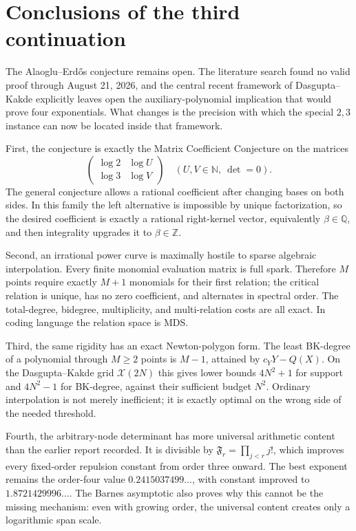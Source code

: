 \documentclass[11pt,oneside]{article}
\theoremstyle{definition}
\theoremstyle{remark}
\newcommand{\N}{\mathbb N}
\newcommand{\Z}{\mathbb Z}
\newcommand{\Q}{\mathbb Q}
\newcommand{\SF}[1]{\mathfrak F_{#1}}
\begin{document}
\section{Conclusions of the third continuation}
\label{sec:thirdconclusion}

The Alaoglu--Erd\H{o}s conjecture remains open.  The literature search found no valid proof
through August 21, 2026, and the central recent framework of Dasgupta--Kakde explicitly leaves
open the auxiliary-polynomial implication that would prove four exponentials.  What changes
is the precision with which the special $2,3$ instance can now be located inside that
framework.

First, the conjecture is exactly the Matrix Coefficient Conjecture on the matrices
\[
 \begin{pmatrix}\log2&\log U\\\log3&\log V\end{pmatrix}
 \quad(U,V\in\N,\ \det=0).
\]
The general conjecture allows a rational coefficient after changing bases on both sides.  In
this family the left alternative is impossible by unique factorization, so the desired
coefficient is exactly a rational right-kernel vector, equivalently $\beta\in\Q$, and then
integrality upgrades it to $\beta\in\Z$.

Second, an irrational power curve is maximally hostile to sparse algebraic interpolation.
Every finite monomial evaluation matrix is full spark.  Therefore $M$ points require exactly
$M+1$ monomials for their first relation; the critical relation is unique, has no zero
coefficient, and alternates in spectral order.  The total-degree, bidegree, multiplicity, and
multi-relation costs are all exact.  In coding language the relation space is MDS.

Third, the same rigidity has an exact Newton-polygon form.  The least BK-degree of a
polynomial through $M\ge2$ points is $M-1$, attained by $c_YY-Q(X)$.  On the
Dasgupta--Kakde grid $\mathcal X(2N)$ this gives lower bounds $4N^2+1$ for support and
$4N^2-1$ for BK-degree, against their sufficient budget $N^2$.  Ordinary interpolation is not
merely inefficient; it is exactly optimal on the wrong side of the needed threshold.

Fourth, the arbitrary-node determinant has more universal arithmetic content than the earlier
report recorded.  It is divisible by $\SF r=\prod_{j<r}j!$, which improves every fixed-order
repulsion constant from order three onward.  The best exponent remains the order-four value
$0.2415037499\ldots$, with constant improved to $1.8721429996\ldots$.  The Barnes asymptotic
also proves why this cannot be the missing mechanism: even with growing order, the universal
content creates only a logarithmic span scale.
\end{document}
